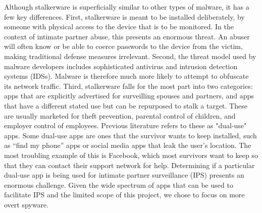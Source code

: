 \documentclass[acmtog]{acmart}
\begin{document}
Although stalkerware is superficially similar to other types of malware, it has 
a few key differences. First, stalkerware is meant to be installed 
deliberately, by someone with physical access to the device that is to be 
monitored. In the context of intimate partner abuse, this presents an enormous 
threat. An abuser will often know or be able to coerce passwords to the device 
from the victim, making traditional defense measures irrelevant. Second, the 
threat model used by malware developers includes sophisticated antivirus and 
intrusion detection systems (IDSs). Malware is therefore much more likely to 
attempt to obfuscate its network traffic. Third, stalkerware falls for the most 
part into two categories: apps that are explicitly advertised for surveilling 
spouses and partners, and apps that have a different stated use but can be 
repurposed to stalk a target. These are usually marketed for theft prevention, 
parental control of children, and employer control of employees. Previous 
literature refers to these as "dual-use" apps\cite{chatterjee_spyware_2018}. 
Some dual-use apps are ones that the survivor wants to keep installed, such as 
``find my phone'' apps or social media apps that leak the user's location. The 
most troubling example of this is Facebook, which most survivors want to keep 
so that they can contact their support network for help.  
Determining if a particular dual-use app is being used for 
intimate partner surveillance (IPS) presents an enormous challenge. Given the 
wide spectrum of apps that can be used to facilitate IPS and the limited scope 
of this project, we chose to focus on more overt spyware.
\end{document}
